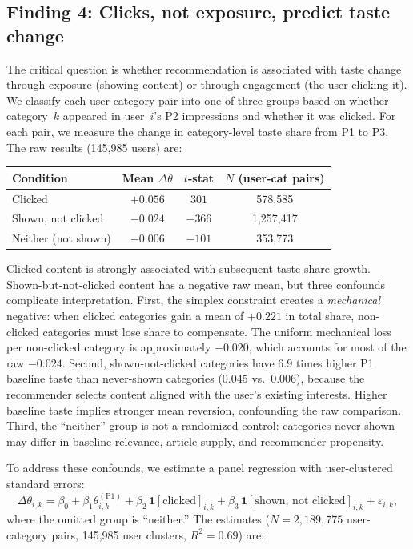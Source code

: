\documentclass[11pt]{article}
\begin{document}
\subsection{Finding 4: Clicks, not exposure, predict taste change}

The critical question is whether recommendation is associated with taste change through exposure (showing content) or through engagement (the user clicking it). We classify each user-category pair into one of three groups based on whether category~$k$ appeared in user~$i$'s P2 impressions and whether it was clicked. For each pair, we measure the change in category-level taste share from P1 to P3. The raw results (145,985 users) are:

\begin{center}
\begin{tabular}{lccc}
\toprule
Condition & Mean $\Delta\theta$ & $t$-stat & $N$ (user-cat pairs) \\
\midrule
Clicked & $+0.056$ & $301$ & 578,585 \\
Shown, not clicked & $-0.024$ & $-366$ & 1,257,417 \\
Neither (not shown) & $-0.006$ & $-101$ & 353,773 \\
\bottomrule
\end{tabular}
\end{center}

Clicked content is strongly associated with subsequent taste-share growth. Shown-but-not-clicked content has a negative raw mean, but three confounds complicate interpretation. First, the simplex constraint creates a \emph{mechanical} negative: when clicked categories gain a mean of $+0.221$ in total share, non-clicked categories must lose share to compensate. The uniform mechanical loss per non-clicked category is approximately $-0.020$, which accounts for most of the raw $-0.024$. Second, shown-not-clicked categories have 6.9 times higher P1 baseline taste than never-shown categories (0.045 vs.\ 0.006), because the recommender selects content aligned with the user's existing interests. Higher baseline taste implies stronger mean reversion, confounding the raw comparison. Third, the ``neither'' group is not a randomized control: categories never shown may differ in baseline relevance, article supply, and recommender propensity.

To address these confounds, we estimate a panel regression with user-clustered standard errors:
\[
\Delta\theta_{i,k} = \beta_0 + \beta_1 \theta_{i,k}^{(\text{P1})} + \beta_2 \, \mathbf{1}[\text{clicked}]_{i,k} + \beta_3 \, \mathbf{1}[\text{shown, not clicked}]_{i,k} + \varepsilon_{i,k},
\]
where the omitted group is ``neither.'' The estimates ($N = 2{,}189{,}775$ user-category pairs, 145,985 user clusters, $R^2 = 0.69$) are:
\end{document}
